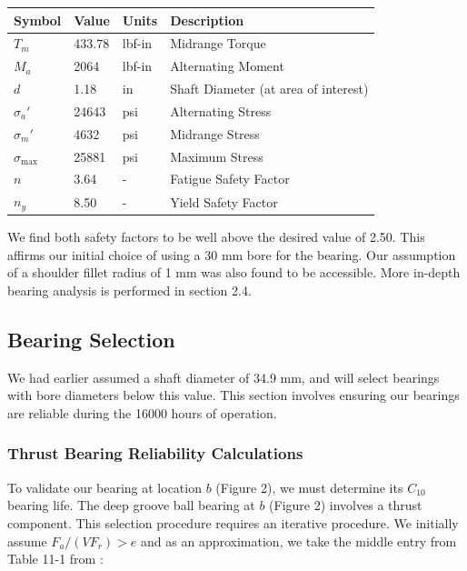 \documentclass[letterpaper,12pt]{article}
\begin{document}
\begin{center}
	\begin{tabular}{ |p{1.5cm}||p{1.2cm}|p{2cm}|p{7cm}|  }
		\hline
		Symbol & Value & Units & Description\\
		\hline
		$T_m$ & 433.78 & lbf-in & Midrange Torque\\
        $M_a$ & 2064 & lbf-in  & Alternating Moment\\			
		$d$ & 1.18 & in  & Shaft Diameter (at area of interest)\\
		\hline
		\hline
		$\sigma_a'$ & 24643 & psi & Alternating Stress\\
		$\sigma_m'$ & 4632 & psi & Midrange Stress\\
		$\sigma_{\text{max}}$ & 25881 & psi & Maximum Stress\\
		\hline
		\hline
		$n$ & 3.64 & - & Fatigue Safety Factor\\
		$n_y$ & 8.50 & - & Yield Safety Factor\\
		\hline
	\end{tabular}
\end{center}

\noindent We find both safety factors to be well above the desired value of 2.50. This affirms our initial choice of using a 30 mm bore for the bearing. Our assumption of a shoulder fillet radius of 1 mm was also found to be accessible. More in-depth bearing analysis is performed in section 2.4.

\subsection{Bearing Selection}
We had earlier assumed a shaft diameter of 34.9 mm, and will select bearings with bore diameters below this value. This section involves ensuring our bearings are reliable during the 16000 hours of operation.

\subsubsection{Thrust Bearing Reliability Calculations}
To validate our bearing at location $b$ (Figure 2), we must determine its $C_{10}$ bearing life. The deep groove ball bearing at $b$ (Figure 2) involves a thrust component. This selection procedure requires an iterative procedure. We initially assume $F _ { a } / ( V F _ { r }) > e$ and as an approximation, we take the middle entry from Table 11-1 from \cite{shigley}:
\end{document}
